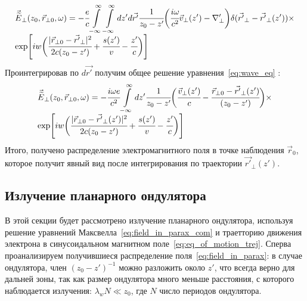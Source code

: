 \begin{equation}
	\begin{array}{lcl}
		\vec{\widetilde{E}}_{\bot}(z_0,  \vec{r}_{\bot 0}, \omega) = -\cfrac{e}{c}  \displaystyle\int\limits_{-\infty}^{\infty}\int\limits_{-\infty}^{\infty} dz'd\vec{r'}\cfrac{1}{z_0 - z'}
		\bigg(\cfrac{i\omega}{c^2}\vec{v}_{\bot}(z')
		-\nabla'_{\bot}\bigg) \delta(\vec{r'}_{\bot} - \vec{r'}_{\bot}(z'))\times\\
		\exp[iw\bigg( \cfrac{|\vec{r}_{\bot 0} - \vec{r'}_{\bot}|^2}{2c(z_0 - z')} +\cfrac{s(z')}{v} - \cfrac{z'}{c} \bigg)]
	\end{array}	
\end{equation}
Проинтегрировав по $d\vec{r'}$ получим общее решение уравнения~\ref{eq:wave_eq} :
\begin{equation}
	\label{eq:field_in_parax_com}
	\begin{array}{lcl}
		\vec{\widetilde{E}}_{\bot}(z_0,  \vec{r}_{\bot 0}, \omega) = -\cfrac{i\omega e}{c^2}  \displaystyle\int\limits_{-\infty}^{\infty} dz'
		\cfrac{1}{z_0 - z'}
		\bigg(\cfrac{\vec{v}_{\bot}(z')}{c}
		- \cfrac{\vec{r}_{\bot 0} - \vec{r'}_{\bot}(z')}{(z_0 - z')}\bigg)\times\\
		\exp[iw\bigg(\cfrac{|\vec{r}_{\bot 0} - \vec{r'}_{\bot}(z')|^2}{2c(z_0 - z')} + \cfrac{s(z')}{v} - \cfrac{z'}{c} \bigg)]
	\end{array}	
\end{equation}
Итого, получено распределение электромагнитного поля в точке наблюдения $\vec{r}_0$, которое получит явный вид после интегрирования по траектории $\vec{r'}_{\bot}(z')$.

\subsection{Излучение планарного ондулятора}
В этой секции будет рассмотрено излучение планарного ондулятора, используя решение уравнений Максвелла~\ref{eq:field_in_parax_com} и траетторию движения электрона в синусоидальном магнитном поле~\ref{eq:eq_of_motion_trej}. Сперва проанализируем получившиеся распределение поля~\ref{eq:field_in_parax}: в случае ондулятора, член $(z_0 - z')^{-1}$ можно разложить около $z'$, что всегда верно для дальней зоны, так как размер ондулятора много меньше расстояния, с которого наблюдается излучения: $\lambda_w N \ll z_0$, где $N$ число периодов ондулятора.


